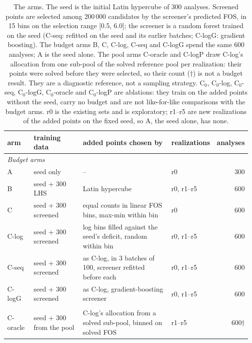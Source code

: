 \begin{table}[htbp]
\centering
\small
\setlength{\tabcolsep}{4pt}
\caption{The arms. The seed is the initial Latin hypercube of 300 analyses. Screened points are selected among 200\,000 candidates by the screener's predicted FOS, in 15 bins on the selection range [0.5, 6.0]; the screener is a random forest trained on the seed (C-seq: refitted on the seed and its earlier batches; C-logG: gradient boosting). The budget arms B, C, C-log, C-seq and C-logG spend the same 600 analyses; A is the seed alone. The pool arms C-oracle and C-logP draw C-log's allocation from one sub-pool of the solved reference pool per realization: their points were solved before they were selected, so their count (†) is not a budget result. They are a diagnostic reference, not a sampling strategy. C$_0$, C$_0$-log, C$_0$-seq, C$_0$-logG, C$_0$-oracle and C$_0$-logP are ablations: they train on the added points without the seed, carry no budget and are not like-for-like comparisons with the budget arms. r0 is the existing sets and is exploratory; r1–r5 are new realizations of the added points on the fixed seed, so A, the seed alone, has none.}
\label{tab:budget}
\begin{tabular}{llllr}
\toprule
arm & training data & added points chosen by & realizations & analyses \\
\midrule
\multicolumn{5}{l}{\textit{Budget arms}} \\
A & seed only & \parbox[t]{4.6cm}{\raggedright --\strut} & r0 & 300 \\
B & seed + 300 LHS & \parbox[t]{4.6cm}{\raggedright Latin hypercube\strut} & r0, r1–r5 & 600 \\
C & seed + 300 screened & \parbox[t]{4.6cm}{\raggedright equal counts in linear FOS bins, max-min within bin\strut} & r0 & 600 \\
C-log & seed + 300 screened & \parbox[t]{4.6cm}{\raggedright log bins filled against the seed's deficit, random within bin\strut} & r0, r1–r5 & 600 \\
C-seq & seed + 300 screened & \parbox[t]{4.6cm}{\raggedright as C-log, in 3 batches of 100, screener refitted before each\strut} & r0, r1–r5 & 600 \\
C-logG & seed + 300 screened & \parbox[t]{4.6cm}{\raggedright as C-log, gradient-boosting screener\strut} & r0, r1–r5 & 600 \\
\addlinespace
{} \\
C-oracle & seed + 300 from the pool & \parbox[t]{4.6cm}{\raggedright C-log's allocation from a solved sub-pool, binned on solved FOS\strut} & r1–r5 & 600† \\

\end{tabular}
\end{table}
